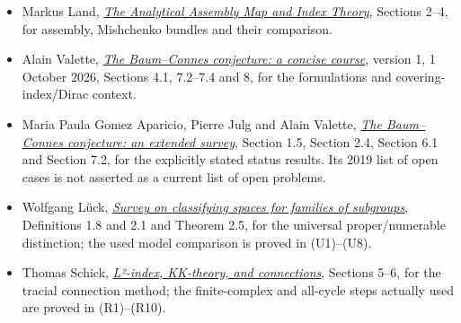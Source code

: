 \documentclass[
  11pt,
]{article}
\begin{document}
\begin{itemize}
\item
  Markus Land, \href{https://arxiv.org/abs/1306.5657}{\emph{The
  Analytical Assembly Map and Index Theory}}, Sections 2--4, for
  assembly, Mishchenko bundles and their comparison.
\item
  Alain Valette, \href{https://arxiv.org/abs/2610.01802}{\emph{The
  Baum--Connes conjecture: a concise course}}, version 1, 1 October
  2026, Sections 4.1, 7.2--7.4 and 8, for the formulations and
  covering-index/Dirac context.
\item
  Maria Paula Gomez Aparicio, Pierre Julg and Alain Valette,
  \href{https://arxiv.org/abs/1905.10081}{\emph{The Baum--Connes
  conjecture: an extended survey}}, Section 1.5, Section 2.4, Section
  6.1 and Section 7.2, for the explicitly stated status results. Its
  2019 list of open cases is not asserted as a current list of open
  problems.
\item
  Wolfgang Lück, \href{https://arxiv.org/abs/math/0312378}{\emph{Survey
  on classifying spaces for families of subgroups}}, Definitions 1.8 and
  2.1 and Theorem 2.5, for the universal proper/numerable distinction;
  the used model comparison is proved in (U1)--(U8).
\item
  Thomas Schick,
  \href{https://arxiv.org/abs/math/0306171}{\emph{L²-index, KK-theory,
  and connections}}, Sections 5--6, for the tracial connection method;
  the finite-complex and all-cycle steps actually used are proved in
  (R1)--(R10).
\end{itemize}
\end{document}

